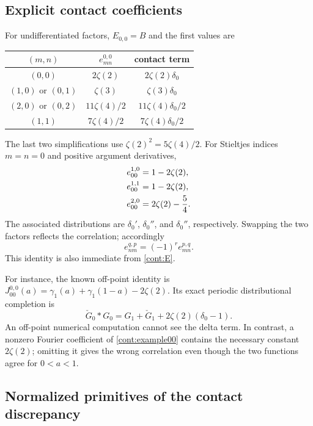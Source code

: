 \documentclass[11pt,a4paper]{article}
\theoremstyle{definition}
\theoremstyle{remark}
\numberwithin{equation}{section}
\begin{document}
\subsection{Explicit contact coefficients}

For undifferentiated factors, $E_{0,0}=B$ and the first values are
\begin{center}
\begin{tabular}{c c c}
\toprule
$(m,n)$ & $e_{mn}^{0,0}$ & contact term\\
\midrule
$(0,0)$ & $2\zeta(2)$ & $2\zeta(2)\delta_0$\\
$(1,0)$ or $(0,1)$ & $\zeta(3)$ & $\zeta(3)\delta_0$\\
$(2,0)$ or $(0,2)$ & $11\zeta(4)/2$ & $11\zeta(4)\delta_0/2$\\
$(1,1)$ & $7\zeta(4)/2$ & $7\zeta(4)\delta_0/2$\\
\bottomrule
\end{tabular}
\end{center}
The last two simplifications use $\zeta(2)^2=5\zeta(4)/2$.
For Stieltjes indices $m=n=0$ and positive argument derivatives,
\begin{align}
 e_{00}^{1,0}&=1-2\zeta(2),\notag\\
 e_{00}^{1,1}&=1-2\zeta(2),\notag\\
 e_{00}^{2,0}&=2\zeta(2)-\frac54.
 \label{cont:low-examples}
\end{align}
The associated distributions are $\delta_0'$, $\delta_0''$, and
$\delta_0''$, respectively.  Swapping the two factors reflects the
correlation; accordingly
\begin{equation}\label{cont:reflection}
 e_{nm}^{q,p}=(-1)^r e_{mn}^{p,q}.
\end{equation}
This identity is also immediate from \eqref{cont:E}.

For instance, the known off-point identity is
$J_{00}^{0,0}(a)=\gamma_1(a)+\gamma_1(1-a)-2\zeta(2)$.
Its exact periodic distributional completion is
\begin{equation}\label{cont:example00}
 \check G_0*G_0=G_1+\check G_1+2\zeta(2)(\delta_0-1).
\end{equation}
An off-point numerical computation cannot see the delta term.
In contrast, a nonzero Fourier coefficient of \eqref{cont:example00}
contains the necessary constant $2\zeta(2)$; omitting it gives the
wrong correlation even though the two functions agree for $0<a<1$.

\subsection{Normalized primitives of the contact discrepancy}
\end{document}
